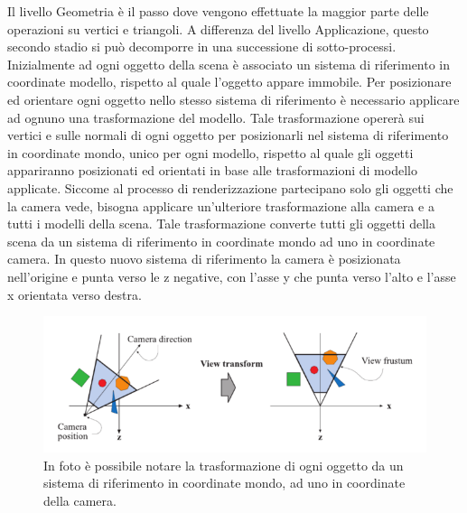 Il livello Geometria è il passo dove vengono effettuate la maggior parte delle operazioni su vertici e triangoli. A differenza del livello Applicazione, questo secondo stadio si può decomporre in una successione di sotto-processi.
Inizialmente ad ogni oggetto della scena è associato un sistema di riferimento in coordinate modello, rispetto al quale l’oggetto appare immobile. 
Per posizionare ed orientare ogni oggetto nello stesso sistema di riferimento è necessario applicare ad ognuno una trasformazione del modello.  Tale trasformazione opererà sui vertici e sulle normali di ogni oggetto per posizionarli nel sistema di riferimento in coordinate mondo, unico per ogni modello, rispetto al quale gli oggetti appariranno posizionati ed orientati in base alle trasformazioni di modello applicate. 
Siccome al processo di renderizzazione partecipano solo gli oggetti che la camera vede, bisogna applicare un’ulteriore trasformazione alla camera e a tutti i modelli della scena. 
Tale trasformazione converte tutti gli oggetti della scena da un sistema di riferimento in coordinate mondo ad uno in coordinate camera. 
In questo nuovo sistema di riferimento la camera è posizionata nell’origine e punta verso le z negative, con l’asse y che punta verso l’alto e l’asse x orientata verso destra.
\\
\begin{figure}[htb]
 \centering
 \includegraphics[width=1.0\linewidth]{images/chapter_stato_arte/stato_arte_view_transform.png}\hfill
 \caption[Trasformazione della vista]{In foto è possibile notare la trasformazione di ogni oggetto da un sistema di riferimento in coordinate mondo, ad uno in coordinate della camera.}
 \label{fig:stato_arte_trasfvista}
\end{figure}

